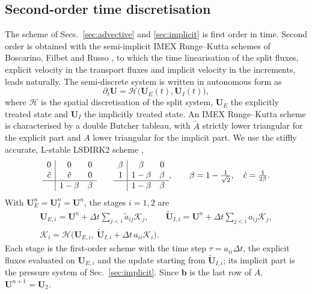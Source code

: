 \subsection{Second-order time discretisation}
\label{sec:time}
The scheme of Secs.~\ref{sec:advective} and \ref{sec:implicit} is first order in time. Second order is obtained with the
semi-implicit IMEX Runge--Kutta schemes of Boscarino, Filbet and Russo \cite{BoscarinoFilbetRusso2016}, to which the time
linearisation of the split fluxes, explicit velocity in the transport fluxes and implicit velocity in the increments, leads
naturally. The semi-discrete system is written in autonomous form as
\begin{equation}
\partial_t\mathbf U=\mathcal H\big(\mathbf U_E(t),\mathbf U_I(t)\big),
\label{eq:autonomous}
\end{equation}
where $\mathcal H$ is the spatial discretisation of the split system, $\mathbf U_E$ the explicitly treated state and $\mathbf U_I$ the
implicitly treated state. An IMEX Runge--Kutta scheme \cite{Ascher1997,PareschiRusso2005} is characterised by a double Butcher
tableau, with $\tilde A$ strictly lower triangular for the explicit part and $A$ lower triangular for the implicit part. We use the
stiffly accurate, L-stable LSDIRK2 scheme \cite{BoscarinoFilbetRusso2016,Avgerinos2019},
\begin{equation}
\begin{array}{c|cc}0&0&0\\ \hat c&\hat c&0\\\hline &1-\beta&\beta\end{array}\qquad
\begin{array}{c|cc}\beta&\beta&0\\ 1&1-\beta&\beta\\\hline &1-\beta&\beta\end{array},\qquad \beta=1-\tfrac1{\sqrt2},\quad \hat c=\tfrac1{2\beta}.
\label{eq:lsdirk}
\end{equation}
With $\mathbf U^n_E=\mathbf U^n_I=\mathbf U^n$, the stages $i=1,2$ are
\begin{equation}
\begin{gathered}
\mathbf U_{E,i}=\mathbf U^n+\Delta t\sum_{j<i}\tilde a_{ij}\mathcal K_j,\qquad \tilde{\mathbf U}_{I,i}=\mathbf U^n+\Delta t\sum_{j<i}a_{ij}\mathcal K_j,\\
\mathcal K_i=\mathcal H\big(\mathbf U_{E,i},\ \tilde{\mathbf U}_{I,i}+\Delta t\,a_{ii}\mathcal K_i\big).
\end{gathered}
\label{eq:stages}
\end{equation}
Each stage is the first-order scheme with the time step $\tau=a_{ii}\Delta t$, the explicit fluxes evaluated on $\mathbf U_{E,i}$ and
the update starting from $\tilde{\mathbf U}_{I,i}$; its implicit part is the pressure system of Sec.~\ref{sec:implicit}. Since $\mathbf b$
is the last row of $A$, $\mathbf U^{n+1}=\mathbf U_2$.

